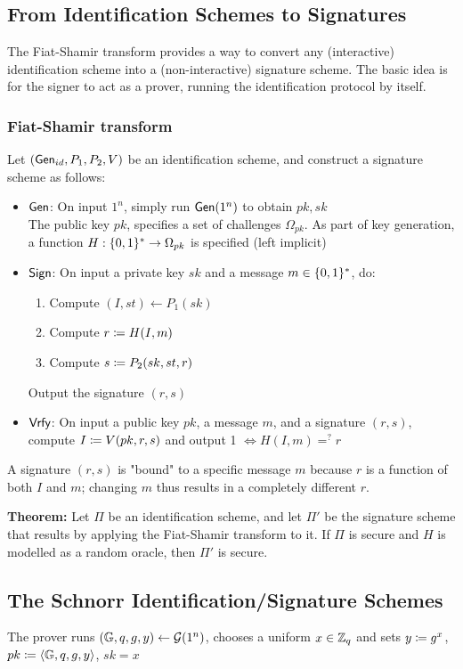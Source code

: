 \documentclass[12pt]{article}
\begin{document}
\subsection{From Identification Schemes to Signatures}
The Fiat-Shamir transform provides a way to convert any (interactive) identification scheme into a (non-interactive) signature scheme. The basic idea is for the signer to act as a prover, running the identification protocol by itself.

\subsubsection{Fiat-Shamir transform}
Let $(\operatorname{\mathsf{Gen}}_{id}, P_1,P_2,V)$ be an identification scheme, and construct a signature scheme as follows:
\begin{itemize}
	\item $\operatorname{\mathsf{Gen}}$: On input $1^n$, simply run $\operatorname{\mathsf{Gen}}(1^n)$ to obtain $pk,sk$\\
	The public key $pk$, specifies a set of challenges $\Omega_{pk}$. As part of key generation, a function $H: \{0, 1\}^* \rightarrow \Omega_{pk} $ is specified (left implicit)
	\item $\operatorname{\mathsf{Sign}}$: On input a private key $sk$ and a message $m \in \{0, 1\}^*$, do:
	\begin{enumerate}
		\item Compute $(I,st) \leftarrow P_1(sk)$
		\item Compute $r \coloneqq H(I,m)$
		\item Compute $s\coloneqq P_2(sk,st,r)$
	\end{enumerate}
	Output the signature $(r,s)$
	\item $\operatorname{\mathsf{Vrfy}}$: On input a public key $pk$, a message $m$, and a signature $(r,s)$, compute $I \coloneqq V(pk,r,s)$ and output 1 $\iff H(I,m)=^?r$ 
\end{itemize}

A signature $(r,s)$ is "bound" to a specific message $m$ because $r$ is a function of both $I$ and $m$; changing $m$ thus results in a completely different $r$.


\textbf{Theorem:} Let $\Pi$ be an identification scheme, and let $\Pi'$ be the signature scheme that results by applying the Fiat-Shamir transform to it. If $\Pi$ is secure and $H$ is modelled as a random oracle, then $\Pi'$ is secure. 



\subsection{The Schnorr Identification/Signature Schemes}
The prover runs $(\mathbb{G}, q, g, y) \leftarrow \mathcal{G}(1^n)$, chooses a uniform $x \in \mathbb{Z}_q$ and sets $y \coloneqq g^x$, $pk \coloneqq \langle \mathbb{G},q,g,y \rangle $,  $sk = x$
\end{document}
